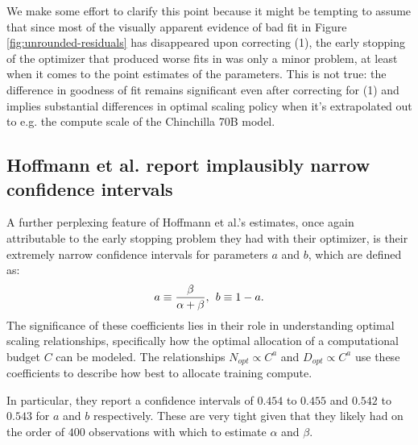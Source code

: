 \documentclass[twocolumn]{article}
\begin{document}
We make some effort to clarify this point because it might be tempting to assume that since most of the visually apparent evidence of bad fit in Figure \ref{fig:unrounded-residuals} has disappeared upon correcting (1), the early stopping of the optimizer that produced worse fits in \cite{hoffmann2022training} was only a minor problem, at least when it comes to the point estimates of the parameters. This is not true: the difference in goodness of fit remains significant even after correcting for (1) and implies substantial differences in optimal scaling policy when it's extrapolated out to e.g. the compute scale of the Chinchilla 70B model.

\subsection{Hoffmann et al. report implausibly narrow confidence intervals}
\label{sec:confidence_intervals}

A further perplexing feature of Hoffmann et al.'s estimates, once again attributable to the early stopping problem they had with their optimizer, is their extremely narrow confidence intervals for parameters $a$ and $b$, which are defined as:
\begin{equation}
    a \equiv \frac{\beta}{\alpha+ \beta}, \hspace{0.15cm} b \equiv 1-a.
\end{equation}
The significance of these coefficients lies in their role in understanding optimal scaling relationships, specifically how the optimal allocation of a computational budget $C$ can be modeled. The relationships $N_{opt} \propto C^{a}$ and $D_{opt} \propto C^{a}$ use these coefficients to describe how best to allocate training compute.

In particular, they report a confidence intervals of $0.454$ to $0.455$ and $0.542$ to $0.543$ for $a$ and $b$ respectively. These are very tight given that they likely had on the order of $400$ observations with which to estimate $\alpha$ and $\beta$.
\end{document}
